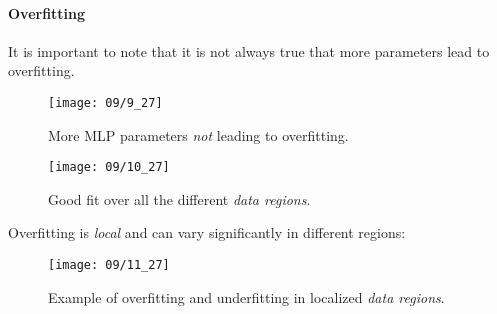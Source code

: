 

\paragraph{Overfitting}

It is important to note that it is not always true that more parameters lead to overfitting.
\begin{figure}[H]
    \centering
    \texttt{[image: 09/9\_27]}
    \caption{More MLP parameters \emph{not} leading to overfitting.}	
\end{figure}

\begin{figure}[H]
    \centering
    \texttt{[image: 09/10\_27]}
    \caption{Good fit over all the different \emph{data regions}.}	
\end{figure}

Overfitting is \emph{local} and can vary significantly in different regions:
\begin{figure}[H]
    \centering
    \texttt{[image: 09/11\_27]}
    \caption{Example of overfitting and underfitting in localized \emph{data regions}.}	
\end{figure}

